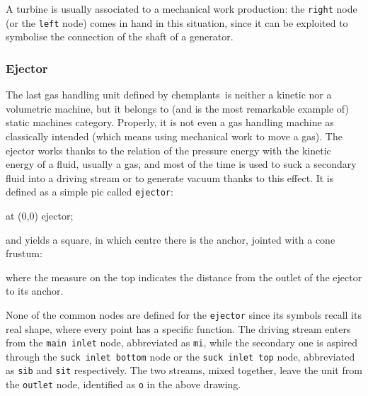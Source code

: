 \documentclass[12pt]{article}						%
\newcommand*{\chpn}[1]{\texttt{#1}}				%
\newcommand*{\chpp}[1]{\texttt{#1}}				%
\newcommand*{\chemplants}{chemplants}
\begin{document}
A turbine is usually associated to a mechanical work production: the \chpn{right}
node (or the \chpn{left} node) comes in hand in this situation, since it can be
exploited to symbolise the connection of the shaft of a generator.

\subsubsection{Ejector}

The last gas handling unit defined by \chemplants\ is neither a kinetic nor
a volumetric machine, but it belongs to (and is the most remarkable example of)
static machines category. Properly, it is not even a gas handling machine as
classically intended (which means using mechanical work to move a gas). The
ejector works thanks to the relation of the pressure energy with the kinetic
energy of a fluid, usually a gas, and most of the time is used to suck a
secondary fluid into a driving stream or to generate vacuum thanks to this
effect. It is defined as a simple pic called \chpp{ejector}:
\begin{chpcode}
	\pic at (0,0) {ejector};
\end{chpcode}
and yields a square, in which centre there is the anchor, jointed with a cone
frustum:
\begin{center}
\end{center}
where the measure on the top indicates the distance from the outlet of the
ejector to its anchor.

None of the common nodes are defined for the \chpp{ejector} since its symbols
recall its real shape, where every point has a specific function. The driving
stream enters from the \chpn{main inlet} node, abbreviated as \chpn{mi}, while
the secondary one is aspired through the \chpn{suck inlet bottom} node or the
\chpn{suck inlet top} node, abbreviated as \chpn{sib} and \chpn{sit}
respectively. The two streams, mixed together, leave the unit from the
\chpn{outlet} node, identified as \chpn{o} in the above drawing.
\end{document}
